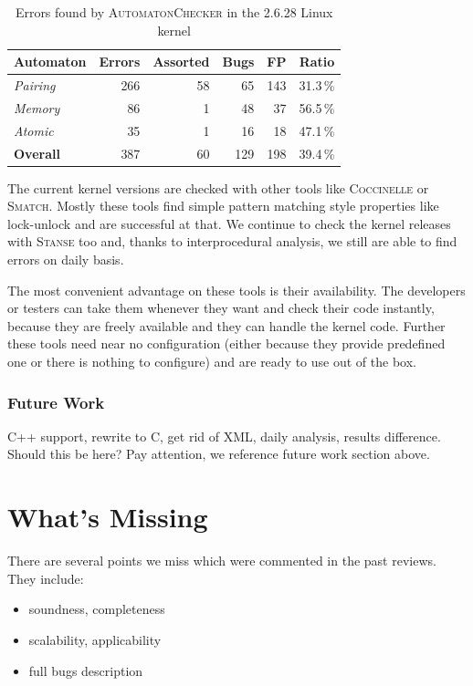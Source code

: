 \documentclass[10pt]{llncs}
\newcommand{\Stanse}{\textsc{Stanse}\xspace}
\newcommand{\AC}{\textsc{AutomatonChecker}\xspace}
\begin{document}
\begin{table}[tb]
\begin{center}
\begin{tabular}{|l|r|r|r|r|r|} \hline
\textbf{Automaton} & \textbf{Errors} & \textbf{Assorted} & \textbf{Bugs} &
\textbf{FP} & \textbf{Ratio} \\ \hline\hline
\textit{Pairing} & 266 & 58 & 65  & 143 & 31.3\,\% \\ \hline
\textit{Memory}  & 86  & 1  & 48  & 37  & 56.5\,\% \\ \hline
\textit{Atomic}  & 35  & 1  & 16  & 18  & 47.1\,\% \\ \hline\hline
\textbf{Overall} & 387 & 60 & 129 & 198 & 39.4\,\% \\ \hline
\end{tabular}
\end{center}
\caption{Errors found by \AC in the 2.6.28 Linux kernel}
\label{tab:results}
\end{table}

The current kernel versions are checked with other tools like
\textsc{Coccinelle} or \textsc{Smatch}. Mostly these tools find simple pattern
matching style properties like lock-unlock and are successful at that. We
continue to check the kernel releases with \Stanse too and, thanks to
interprocedural analysis, we still are able to find errors on daily basis.

The most convenient advantage on these tools is their availability. The
developers or testers can take them whenever they want and check their code
instantly, because they are freely available and they can handle the kernel
code. Further these tools need near no configuration (either because they
provide predefined one or there is nothing to configure) and are ready to use
out of the box.

\subsubsection{Future Work}
C++ support, rewrite to C, get rid of XML, daily analysis, results difference.
Should this be here? Pay attention, we reference future work section above.

\section{What's Missing}
There are several points we miss which were commented in the past reviews.
They include:
\begin{itemize}
\item soundness, completeness
\item scalability, applicability
\item full bugs description
\end{itemize}
\end{document}
